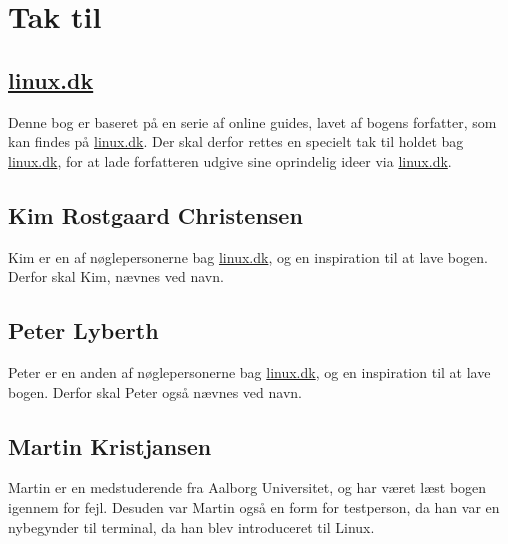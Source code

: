 \section*{Tak til}

\subsection*{\href{http://www.linux.dk}{linux.dk}}
Denne bog er baseret på en serie af online guides, lavet af bogens forfatter, som kan findes på \href{http://www.linux.dk}{linux.dk}. 
Der skal derfor rettes en specielt tak til holdet bag \href{http://www.linux.dk}{linux.dk}, for at lade forfatteren udgive sine oprindelig ideer via \href{http://www.linux.dk}{linux.dk}. 

\subsection*{Kim Rostgaard Christensen}
Kim er en af nøglepersonerne bag \href{http://www.linux.dk}{linux.dk}, og en inspiration til at lave bogen. Derfor skal Kim, nævnes ved navn. 

\subsection*{Peter Lyberth}
Peter er en anden af nøglepersonerne bag \href{http://www.linux.dk}{linux.dk}, og en inspiration til at lave bogen. Derfor skal Peter også nævnes ved navn. 

\subsection*{Martin Kristjansen}
Martin er en medstuderende fra Aalborg Universitet, og har været læst bogen igennem for fejl. Desuden var Martin også en form for testperson, da han var en nybegynder til 
terminal, da han blev introduceret til Linux.
